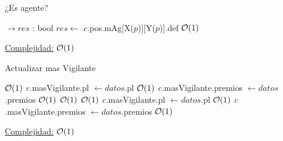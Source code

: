 \begin{Algoritmos}
\begin{algorithm}[H]
\caption{¿Es agente?}
\begin{algorithmic}[1]
	 $\to res$ : bool
	\State $res \gets$ $c$.pos.mAg[X($p$)][Y($p$)].def \Comment $\mathcal{O}(1)$
	\EndProcedure
\end{algorithmic}
\underline{Complejidad:} $\mathcal{O}(1)$
\end{algorithm}


\begin{algorithm}[H]
\caption{Actualizar mas Vigilante}
\begin{algorithmic}[1]
	 \Comment $\mathcal{O}(1)$
		\State $c$.masVigilante.pl $\gets datos$.pl	\Comment $\mathcal{O}(1)$		
		\State $c$.masVigilante.premios $\gets datos$.premios \Comment $\mathcal{O}(1)$
	\EndIf
	 \Comment $\mathcal{O}(1)$
		 \Comment $\mathcal{O}(1)$
			\State $c$.masVigilante.pl $\gets datos$.pl	\Comment $\mathcal{O}(1)$		
			\State $c$.masVigilante.premios $\gets datos$.premios \Comment $\mathcal{O}(1)$
		\EndIf
	\EndIf
	\EndProcedure
\end{algorithmic}
\underline{Complejidad:} $\mathcal{O}(1)$
\end{algorithm}

\end{Algoritmos}
